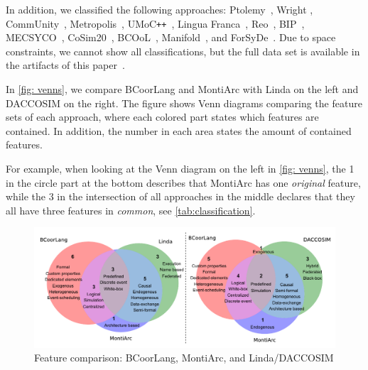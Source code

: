 \documentclass[runningheads]{llncs}
\begin{document}
In addition, we classified the following approaches: Ptolemy~\cite{ekerTamingHeterogeneityPtolemy2003,ptolemaeusSystemDesignModeling2014}, Wright \cite{allenFormalBasisArchitectural1997,allenFormalApproachSoftware1997}, CommUnity~\cite{fiadeiroSemanticsArchitecturalConnectors1997,oliveiraCommUnityWorkbench2007}, Metropolis~\cite{balarinMetropolisIntegratedElectronic2003}, UMoC\texttt{++}~\cite{mathaikuttyUMoCBasedMultiMoC2006}, Lingua Franca~\cite{lohstrohReactorsDeterministicModel2020,lohstrohLinguaFrancaDeterministic2021}, Reo~\cite{arbabReoChannelbasedCoordination2004}, BIP~\cite{bliudzeAlgebraConnectorsStructuring2008,basuRigorousComponentBasedSystem2011},
MECSYCO~\cite{camusCosimulationCyberphysicalSystems2018,camusHybridCosimulationFMUs2016},
CoSim20~\cite{liboniComplexSystemsCosimulation2021},
BCOoL~\cite{varalarsenBehavioralCoordinationOperator2015,varalarsenBCOolBehavioralCoordination2016},
Manifold~\cite{arbabOverviewManifoldIts1993,papadopoulosModellingActivitiesInformation1998}, and ForSyDe~\cite{sanderSystemModelingTransformational2004,sanderForSyDeSystemDesign2016}.
Due to space constraints, we cannot show all classifications, but the full data set is available in the artifacts of this paper~\cite{timkrauterArtifactsCoordination2024}.

In \autoref{fig: venns}, we compare BCoorLang and MontiArc with Linda on the left and DACCOSIM on the right.
The figure shows Venn diagrams comparing the feature sets of each approach, where each colored part states which features are contained.
In addition, the number in each area states the amount of contained features.

For example, when looking at the Venn diagram on the left in \autoref{fig: venns}, the \textsf{1} in the circle part at the bottom describes that MontiArc has one \textit{original} feature, while the \textsf{3} in the intersection of all approaches in the middle declares that they all have three features in \textit{common}, see \autoref{tab:classification}.

\begin{figure}[ht]
	\centering
	\includegraphics[width=1\textwidth]{images/venns}
	\caption{Feature comparison: BCoorLang, MontiArc, and Linda/DACCOSIM}
	\label{fig: venns}
\end{figure}
\end{document}
